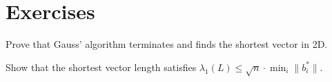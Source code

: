 \section{Exercises}
\begin{exercise}
Prove that Gauss' algorithm terminates and finds the shortest vector in 2D.
\end{exercise}
\begin{exercise}
Show that the shortest vector length satisfies $\lambda_1(L) \le \sqrt{n} \cdot \min_i \|b_i^*\|$.
\end{exercise}

